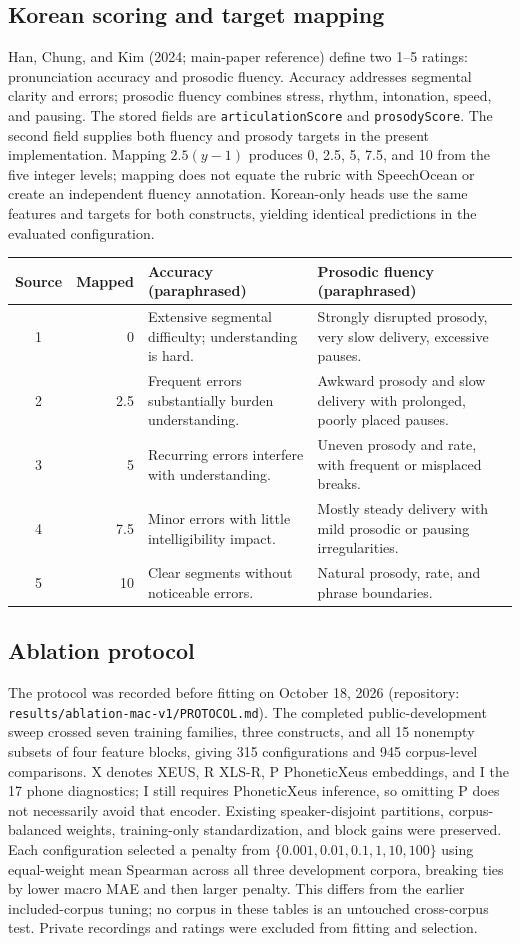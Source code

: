 \documentclass[10pt]{article}
\begin{document}
\subsection{Korean scoring and target mapping}
Han, Chung, and Kim (2024; main-paper reference) define two 1--5 ratings: pronunciation accuracy and prosodic fluency. Accuracy addresses segmental clarity and errors; prosodic fluency combines stress, rhythm, intonation, speed, and pausing. The stored fields are \texttt{articulationScore} and \texttt{prosodyScore}. The second field supplies both fluency and prosody targets in the present implementation. Mapping $2.5(y-1)$ produces 0, 2.5, 5, 7.5, and 10 from the five integer levels; mapping does not equate the rubric with SpeechOcean or create an independent fluency annotation. Korean-only heads use the same features and targets for both constructs, yielding identical predictions in the evaluated configuration.
\begin{center}\begin{tabular}{@{}crp{5.4cm}p{5.4cm}@{}}\toprule
Source & Mapped & Accuracy (paraphrased) & Prosodic fluency (paraphrased)\\\midrule
1 & 0 & Extensive segmental difficulty; understanding is hard. & Strongly disrupted prosody, very slow delivery, excessive pauses.\\
2 & 2.5 & Frequent errors substantially burden understanding. & Awkward prosody and slow delivery with prolonged, poorly placed pauses.\\
3 & 5 & Recurring errors interfere with understanding. & Uneven prosody and rate, with frequent or misplaced breaks.\\
4 & 7.5 & Minor errors with little intelligibility impact. & Mostly steady delivery with mild prosodic or pausing irregularities.\\
5 & 10 & Clear segments without noticeable errors. & Natural prosody, rate, and phrase boundaries.\\\bottomrule
\end{tabular}\end{center}
\subsection{Ablation protocol}
The protocol was recorded before fitting on October 18, 2026 (repository: \nolinkurl{results/ablation-mac-v1/PROTOCOL.md}). The completed public-development sweep crossed seven training families, three constructs, and all 15 nonempty subsets of four feature blocks, giving 315 configurations and 945 corpus-level comparisons. X denotes XEUS, R XLS-R, P PhoneticXeus embeddings, and I the 17 phone diagnostics; I still requires PhoneticXeus inference, so omitting P does not necessarily avoid that encoder. Existing speaker-disjoint partitions, corpus-balanced weights, training-only standardization, and block gains were preserved. Each configuration selected a penalty from $\{0.001,0.01,0.1,1,10,100\}$ using equal-weight mean Spearman across all three development corpora, breaking ties by lower macro MAE and then larger penalty. This differs from the earlier included-corpus tuning; no corpus in these tables is an untouched cross-corpus test. Private recordings and ratings were excluded from fitting and selection.
\end{document}
